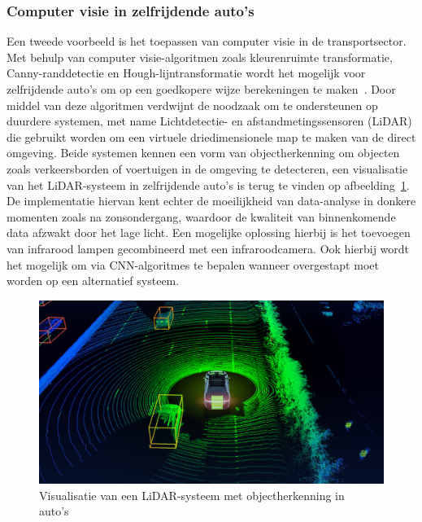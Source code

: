 \subsubsection{Computer visie in zelfrijdende auto's}
Een tweede voorbeeld is het toepassen van computer visie in de transportsector.
Met behulp van computer visie-algoritmen zoals kleurenruimte transformatie, Canny-randdetectie en Hough-lijntransformatie wordt het mogelijk voor zelfrijdende auto's om op een goedkopere wijze berekeningen te maken~\autocite{Gajjar2023}.
Door middel van deze algoritmen verdwijnt de noodzaak om te ondersteunen op duurdere systemen, met name Lichtdetectie- en afstandmetingssensoren (LiDAR) die gebruikt worden om een virtuele driedimensionele map te maken van de direct omgeving.
Beide systemen kennen een vorm van objectherkenning om objecten zoals verkeersborden of voertuigen in de omgeving te detecteren, een visualisatie van het LiDAR-systeem in zelfrijdende auto's is terug te vinden op afbeelding~\ref{fig:visualisatie-lidar}.
De implementatie hiervan kent echter de moeilijkheid van data-analyse in donkere momenten zoals na zonsondergang, waardoor de kwaliteit van binnenkomende data afzwakt door het lage licht.
Een mogelijke oplossing hierbij is het toevoegen van infrarood lampen gecombineerd met een infraroodcamera.
Ook hierbij wordt het mogelijk om via CNN-algoritmes te bepalen wanneer overgestapt moet worden op een alternatief systeem.
\begin{figure}
    \begin{center}
        \includegraphics[scale=0.35]{images/visualisatie-lidar}
        \caption{Visualisatie van een LiDAR-systeem met objectherkenning in auto's~\autocite{Badoni2021}}
        \label{fig:visualisatie-lidar}
    \end{center}
\end{figure}

